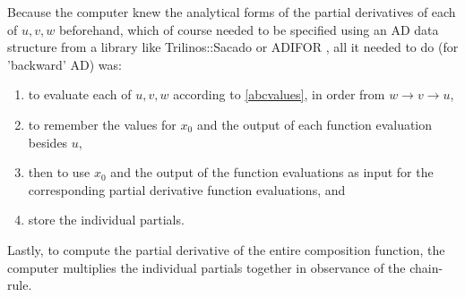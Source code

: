 \documentclass[preprint,12pt]{elsarticle}
\begin{document}
Because the computer knew the analytical forms of the partial derivatives of each of $u,v,w$ beforehand, which of course needed to be specified using an AD data structure from a library like Trilinos::Sacado \cite{trilinos} or ADIFOR \cite{bischof1995adifor},
all it needed to do (for 'backward' AD) was:
\begin{enumerate}
\item to evaluate each of $u,v,w$ according to \ref{abcvalues}, in order from $w \rightarrow
v \rightarrow u$, 
\item to remember the values for $x_0$ and the output of each function evaluation besides  $u$, 
\item then to use $x_0$ and the output of the function evaluations as input for the corresponding partial
derivative function  evaluations, and
\item store the individual partials.
\end{enumerate}
Lastly, to compute the partial derivative of the entire composition function, the computer multiplies
the individual partials together in observance of the chain-rule.  
\end{document}
